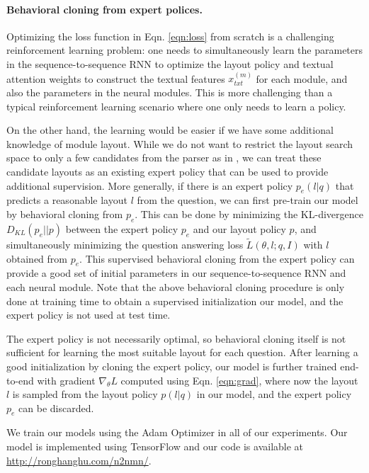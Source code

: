 \documentclass[10pt,twocolumn,letterpaper]{article}
\begin{document}
\paragraph{Behavioral cloning from expert polices.}
Optimizing the loss function in Eqn. \ref{eqn:loss} from scratch is a challenging reinforcement learning problem: one needs to simultaneously learn the parameters in the sequence-to-sequence RNN to optimize the layout policy and textual attention weights to construct the textual features $x_{txt}^{(m)}$ for each module, and also the parameters in the neural modules. This is more challenging than a typical reinforcement learning scenario where one only needs to learn a policy.

On the other hand, the learning would be easier if we have some additional knowledge of module layout. While we do not want to restrict the layout search space to only a few candidates from the parser as in \cite{andreas2016learning}, we can treat these candidate layouts as an existing expert policy that can be used to provide additional supervision. More generally, if there is an expert policy $p_e(l | q)$ that predicts a reasonable layout $l$ from the question, we can first pre-train our model by behavioral cloning from $p_e$. This can be done by minimizing the KL-divergence $D_{KL}(p_e || p)$ between the expert policy $p_e$ and our layout policy $p$, and simultaneously minimizing the question answering loss $\tilde{L}(\theta, l; q, I)$ with $l$ obtained from $p_e$. This supervised behavioral cloning from the expert policy can provide a good set of initial parameters in our sequence-to-sequence RNN and each neural module. Note that the above behavioral cloning procedure is only done at training time to obtain a supervised initialization our model, and the expert policy is not used at test time.

The expert policy is not necessarily optimal, so behavioral cloning itself is not sufficient for learning the most suitable layout for each question. After learning a good initialization by cloning the expert policy, our model is further trained end-to-end with gradient $\nabla_\theta L$ computed using Eqn. \ref{eqn:grad}, where now the layout $l$ is sampled from the layout policy $p(l | q)$ in our model, and the expert policy $p_e$ can be discarded.

We train our models using the Adam Optimizer \cite{kingma2015adam} in all of our experiments. Our model is implemented using TensorFlow \cite{tensorflow2015-whitepaper} and our code is available at \url{http://ronghanghu.com/n2nmn/}.
\end{document}
